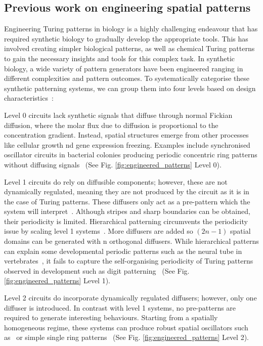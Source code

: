 \subsection{Previous work on engineering spatial patterns}

Engineering Turing patterns in biology is a highly challenging endeavour that has required synthetic biology to gradually develop the appropriate tools.
This has involved creating simpler biological patterns, as well as chemical Turing patterns to gain the necessary insights and tools for this complex task.
In synthetic biology, a wide variety of pattern generators have been engineered ranging in different complexities and pattern outcomes.
To systematically categorise these synthetic patterning systems, we can group them into four levels based on design characteristics~\parencite{huidobro}:

Level 0 circuits lack synthetic signals that diffuse through normal Fickian diffusion, where the molar flux due to diffusion is proportional to the concentration gradient.
Instead, spatial structures emerge from other processes like cellular growth nd gene expression freezing.
Examples include synchronised oscillator circuits in bacterial colonies producing periodic concentric ring patterns without diffusing signals~\parencite{Potvin-Trottier2016, Riglar2019} (See Fig. \ref{fig:engineered_patterns} Level 0).

Level 1 circuits do rely on diffusible components; however, these are not dynamically regulated, meaning they are not produced by the circuit as it is in the case of Turing patterns.
These diffusers only act as a pre-pattern which the system will interpret~\parencite{Basu2005, Schaerli2014, Kong2017, Barbier2020, Grant2020}.
Although stripes and sharp boundaries can be obtained, their periodicity is limited.
Hierarchical patterning circumvents the periodicity issue by scaling level 1 systems~\parencite{Boehm2018}.
More diffusers are added so $(2n-1)$ spatial domains can be generated with n orthogonal diffusers.
While hierarchical patterns can explain some developmental periodic patterns such as the neural tube in vertebrates~\parencite{Briscoe2015}, it fails to capture the self-organising periodicity of Turing patterns observed in development such as digit patterning~\parencite{Sheth2012,Raspopovic1} (See Fig. \ref{fig:engineered_patterns} Level 1).

Level 2 circuits do incorporate dynamically regulated diffusers; however, only one diffuser is introduced.
In contrast with level 1 systems, no pre-patterns are required to generate interesting behaviours.
Starting from a spatially homogeneous regime, these systems can produce robust spatial oscillators such as~\parencite{Danino2010} or simple single ring patterns~\parencite{Cao2016, Payne2013} (See Fig. \ref{fig:engineered_patterns} Level 2).


